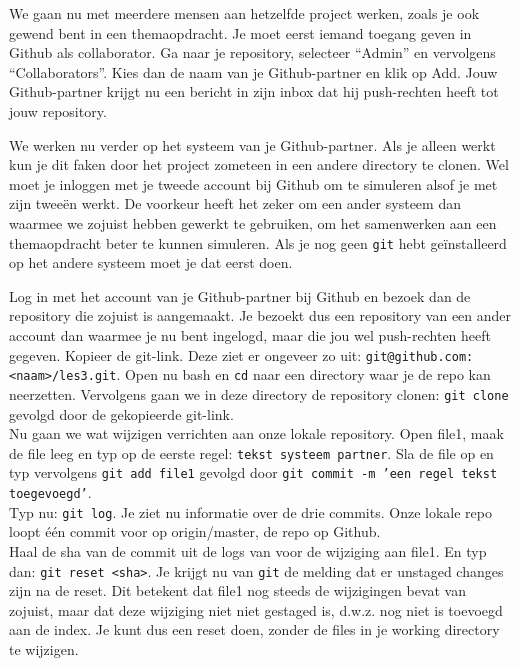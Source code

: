 \step We gaan nu met meerdere mensen aan hetzelfde project werken,
zoals je ook gewend bent in een themaopdracht. Je moet eerst iemand
toegang geven in Github als collaborator. Ga naar je repository,
selecteer ``Admin'' en vervolgens ``Collaborators''. Kies dan de naam
van je Github-partner en klik op Add. Jouw Github-partner krijgt nu
een bericht in zijn inbox dat hij push-rechten heeft tot jouw
repository.

\step We werken nu verder op het systeem van je Github-partner. Als je
alleen werkt kun je dit faken door het project zometeen in een andere directory
te clonen. Wel moet je inloggen met je tweede account bij Github om te
simuleren alsof je met zijn tweeën werkt. De voorkeur heeft het zeker om een ander systeem dan
waarmee we zojuist hebben gewerkt te gebruiken, om het samenwerken aan een
themaopdracht beter te kunnen simuleren. Als je nog geen {\tt git} hebt
geïnstalleerd op het andere systeem moet je dat eerst doen.

Log in met het account van je Github-partner bij Github en
bezoek dan de repository die zojuist is aangemaakt. Je bezoekt dus een
repository van een ander account dan waarmee je nu bent ingelogd, maar
die jou wel push-rechten heeft gegeven. Kopieer de git-link. Deze ziet
er ongeveer zo uit: {\tt git@github.com:<naam>/les3.git}. Open nu
bash en {\tt cd} naar een directory waar je de repo kan neerzetten. Vervolgens
gaan we in deze directory de repository clonen: {\tt git clone} gevolgd door
de gekopieerde git-link. \\

\step Nu gaan we wat wijzigen verrichten aan onze lokale repository.
Open file1, maak de file leeg en typ op de eerste regel: {\tt tekst
  systeem partner}. Sla de file op en typ vervolgens {\tt git add file1} gevolgd door
{\tt git commit -m 'een regel tekst
  toegevoegd'}. \\

\step Typ nu: {\tt git log}. Je ziet nu informatie over de drie
commits. Onze lokale repo loopt één commit voor op origin/master, de
repo op Github. \\

\step Haal de sha van de commit uit de logs van voor de wijziging aan
file1. En typ dan: {\tt git reset <sha>}. Je krijgt nu van {\tt git}
de melding dat er unstaged changes zijn na de reset. Dit betekent dat
file1 nog steeds de wijzigingen bevat van zojuist, maar dat deze
wijziging niet niet gestaged is, d.w.z. nog niet is toevoegd aan de
index. Je kunt dus een reset doen, zonder de files in je working
directory te wijzigen. \\

